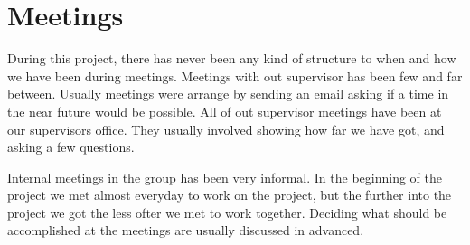 \chapter{Meetings}
During this project, there has never been any kind of structure to when and how we have been during meetings. Meetings with out supervisor has been few and far between. Usually meetings were arrange by sending an email asking if a time in the near future would be possible. All of out supervisor meetings have been at our supervisors office. They usually involved showing how far we have got, and asking a few questions. 

Internal meetings in the group has been very informal. In the beginning of the project we met almost everyday to work on the project, but the further into the project we got the less ofter we met to work together. Deciding what should be accomplished at the meetings are usually discussed in advanced.